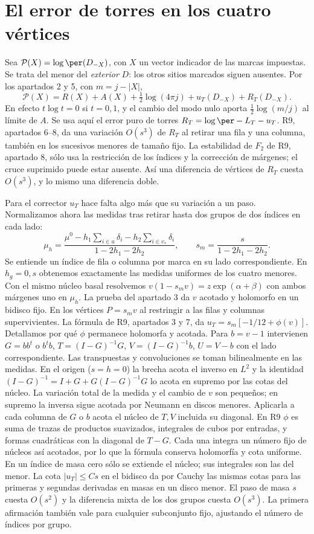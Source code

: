 \section{El error de torres en los cuatro vértices}
Sea $\mathcal P(X)=\log\per(D_{-X})$, con $X$ un vector indicador de las marcas impuestas.
Se trata del menor del \emph{exterior} $D$: los otros sitios marcados siguen ausentes.
Por los apartados 2 y 5, con $m=j-|X|$,
\[
 \mathcal P(X)=R(X)+A(X)+\tfrac12\log(4\pi j)+u_T(D_{-X})+R_T(D_{-X}) .
\]
En efecto $t\log t=0$ si $t=0,1$, y el cambio del modo nulo aporta
$\tfrac12\log(m/j)$ al límite de $A$. Se usa aquí el error puro de torres
$R_T=\log\per-L_T-u_T$. R9, apartados 6--8, da una variación $O(s^3)$ de $R_T$
al retirar una fila y una columna, también en los sucesivos menores de tamaño fijo.
La estabilidad de $F_2$ de R9, apartado 8, sólo usa la restricción de los índices y la
corrección de márgenes; el cruce suprimido puede estar ausente. Así una diferencia
de vértices de $R_T$ cuesta $O(s^3)$, y lo mismo una diferencia doble.

Para el corrector $u_T$ hace falta algo más que su variación a un paso.
Normalizamos ahora las medidas tras retirar hasta dos grupos de dos índices en cada lado:
\[
 \mu_h=\frac{\mu^0-h_1\sum_{i\in u}\delta_i-h_2\sum_{i\in v_*}\delta_i}
                  {1-2h_1-2h_2},\qquad s_m=\frac{s}{1-2h_1-2h_2}.
\]
Se entiende un índice de fila o columna por marca en su lado correspondiente.
En $h_g=0,s$ obtenemos exactamente las medidas uniformes de los cuatro menores.
Con el mismo núcleo basal resolvemos $v(1-s_m v)=z\exp(\alpha+\beta)$ con ambos márgenes
uno en $\mu_h$. La prueba del apartado 3 da $v$ acotado y holomorfo en un bidisco fijo.
En los vértices $P=s_m v$ al restringir a las filas y columnas supervivientes.
La fórmula de R9, apartados 3 y 7, da
$u_T=s_m[-1/12+\phi(v)]$. Detallamos por qué $\phi$ permanece holomorfa y acotada.
Para $b=v-1$ intervienen $G=bb^t$ o $b^tb$, $T=(I-G)^{-1}G$,
$V=(I-G)^{-1}b$, $U=V-b$ con el lado correspondiente.
Las transpuestas y convoluciones se toman bilinealmente en las medidas.
En el origen ($s=h=0$) la brecha acota el inverso en $L^2$ y la identidad
$(I-G)^{-1}=I+G+G(I-G)^{-1}G$ lo acota en supremo por las cotas del núcleo.
La variación total de la medida y el cambio de $v$ son pequeños;
en supremo la inversa sigue acotada por Neumann en discos menores.
Aplicarla a cada columna de $G$ o $b$ acota el núcleo de $T,V$ incluida su diagonal.
En R9 $\phi$ es suma de trazas de productos suavizados, integrales de cubos por entradas,
y formas cuadráticas con la diagonal de $T-G$. Cada una integra un número fijo de
núcleos así acotados, por lo que la fórmula conserva holomorfía y cota uniforme.
En un índice de masa cero sólo se extiende el núcleo; sus integrales son las del menor.
La cota $|u_T|\le Cs$ en el bidisco da por Cauchy las mismas cotas para las primeras
y segundas derivadas en masas en un disco menor. El paso de masa $s$ cuesta $O(s^2)$
y la diferencia mixta de los dos grupos cuesta $O(s^3)$. La primera afirmación también
vale para cualquier subconjunto fijo, ajustando el número de índices por grupo.

